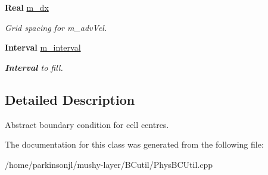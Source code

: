 \begin{DoxyCompactItemize}
\textbf{ Real} \hyperlink{class_abstract_scalar_b_c_function_a32f08977d322c7c498a7567ed309d096}{m\+\_\+dx}
\begin{DoxyCompactList}\small\item\em Grid spacing for m\+\_\+adv\+Vel. \end{DoxyCompactList}\item 
\mbox{\label{class_abstract_scalar_b_c_function_aeac3053b146f1138f2336e7d6562bf97}} 
\textbf{ Interval} \hyperlink{class_abstract_scalar_b_c_function_aeac3053b146f1138f2336e7d6562bf97}{m\+\_\+interval}
\begin{DoxyCompactList}\small\item\em \textbf{ Interval} to fill. \end{DoxyCompactList}\end{DoxyCompactItemize}


\subsection{Detailed Description}
Abstract boundary condition for cell centres. 

The documentation for this class was generated from the following file\+:\begin{DoxyCompactItemize}
\item 
/home/parkinsonjl/mushy-\/layer/\+B\+Cutil/Phys\+B\+C\+Util.\+cpp\end{DoxyCompactItemize}
